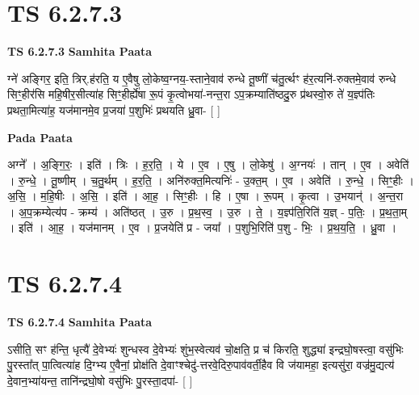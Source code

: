 \documentclass[17pt]{extarticle}
\begin{document}

\section{ TS 6.2.7.3 }

\textbf{TS 6.2.7.3 } \newline
\textbf{Samhita Paata} \newline

ग्ने॑ अङ्गिर॒ इति॒ त्रिर्.ह॑रति॒ य ए॒वैषु लो॒केष्व॒ग्नय॒-स्ताने॒वाव॑ रुन्धे तू॒ष्णीं च॑तु॒र्त्थꣳ ह॑र॒त्यनि॑-रुक्तमे॒वाव॑ रुन्धे सिꣳ॒॒हीर॑सि महि॒षीर॒सीत्या॑ह सिꣳ॒॒हीर्ह्ये॑षा रू॒पं कृ॒त्वोभया॑-नन्त॒रा ऽप॒क्रम्याति॑ष्ठदु॒रु प्र॑थस्वो॒रु ते॑ य॒ज्ञ्प॑तिः प्रथता॒मित्या॑ह॒ यज॑मानमे॒व प्र॒जया॑ प॒शुभिः॑ प्रथयति ध्रु॒वा- [  ] \newline

\textbf{Pada Paata} \newline

अग्ने᳚ । अ॒ङ्गि॒रः॒ । इति॑ । त्रिः । ह॒र॒ति॒ । ये । ए॒व । ए॒षु । लो॒केषु॑ । अ॒ग्नयः॑ । तान् । ए॒व । अवेति॑ । रु॒न्धे॒ । तू॒ष्णीम् । च॒तु॒र्थम् । ह॒र॒ति॒ । अनि॑रुक्त॒मित्यनिः॑ - उ॒क्त॒म् । ए॒व । अवेति॑ । रु॒न्धे॒ । सिꣳ॒॒हीः । अ॒सि॒ । म॒हि॒षीः । अ॒सि॒ । इति॑ । आ॒ह॒ । सिꣳ॒॒हीः । हि । ए॒षा । रू॒पम् । कृ॒त्वा । उ॒भयान्॑ । अ॒न्त॒रा । अ॒प॒क्रम्येत्य॑प - क्रम्य॑ । अति॑ष्ठत् । उ॒रु । प्र॒थ॒स्व॒ । उ॒रु । ते॒ । य॒ज्ञ्प॑ति॒रिति॑ य॒ज्ञ् - प॒तिः॒ । प्र॒थ॒ता॒म् । इति॑ । आ॒ह॒ । यज॑मानम् । ए॒व । प्र॒जयेति॑ प्र - जया᳚ । प॒शुभि॒रिति॑ प॒शु - भिः॒ । प्र॒थ॒य॒ति॒ । ध्रु॒वा ।  \newline





\section{ TS 6.2.7.4 }

\textbf{TS 6.2.7.4 } \newline
\textbf{Samhita Paata} \newline

ऽसीति॒ सꣳ ह॑न्ति॒ धृत्यै॑ दे॒वेभ्यः॑ शुन्धस्व दे॒वेभ्यः॑ शुंभ॒स्वेत्यव॑ चो॒क्षति॒ प्र च॑ किरति॒ शुद्ध्या॑ इन्द्रघो॒षस्त्वा॒ वसु॑भिः पु॒रस्ता᳚त् पा॒त्वित्या॑ह दि॒ग्भ्य ए॒वैनां॒ प्रोक्ष॑ति दे॒वाꣳश्चेदु॑-त्तरवे॒दिरु॒पाव॑वर्ती॒हैव वि ज॑यामहा॒ इत्यसु॑रा॒ वज्र॑मु॒द्यत्य॑ दे॒वान॒भ्या॑यन्त॒ तानि॑न्द्रघो॒षो वसु॑भिः पु॒रस्ता॒दपा॑- [  ] \newline
\end{document}
